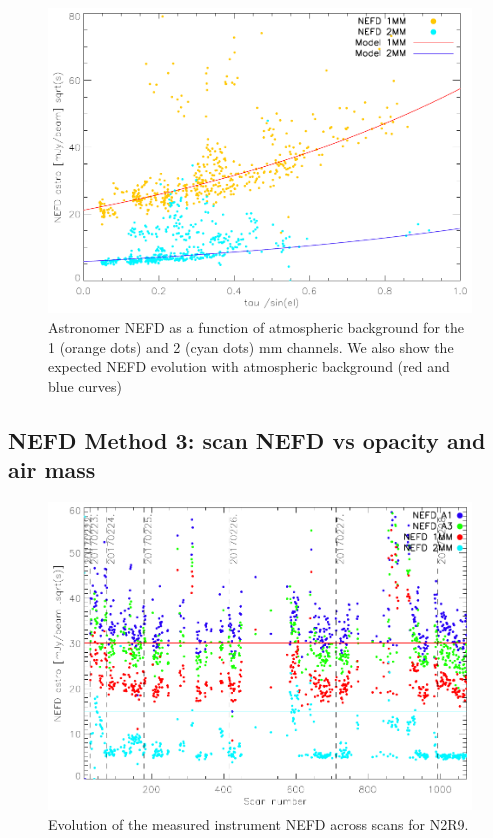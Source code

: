 \documentclass[a4paper, 11pt]{article} %
\begin{document}
\begin{figure}
\begin{center}
\includegraphics[clip, angle=0, scale =0.8]{Figures/NEFDIndScans/nefd_tau_run22.pdf}
\caption{Astronomer NEFD as a function of atmospheric background for the 1 (orange dots) and 2 (cyan dots) mm channels. We also show the expected NEFD evolution with atmospheric background (red and blue curves)}
\label{fig:nefdvsbackground}
\end{center}
\end{figure}

\subsection{NEFD Method 3: scan NEFD vs opacity and air mass}
\begin{figure}
\begin{center}
\includegraphics[clip, angle=0, scale =0.8]{Figures/NEFDIndScans/nefd_evol_run22.pdf}
\caption{Evolution of the measured instrument NEFD across scans for N2R9.}
\label{fig:nefdvsscans}
\end{center}
\end{figure}
\end{document}
